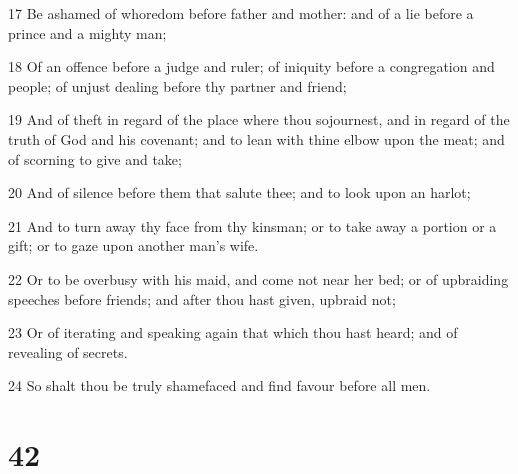 \par 17 Be ashamed of whoredom before father and mother: and of a lie before a prince and a mighty man;
\par 18 Of an offence before a judge and ruler; of iniquity before a congregation and people; of unjust dealing before thy partner and friend;
\par 19 And of theft in regard of the place where thou sojournest, and in regard of the truth of God and his covenant; and to lean with thine elbow upon the meat; and of scorning to give and take;
\par 20 And of silence before them that salute thee; and to look upon an harlot;
\par 21 And to turn away thy face from thy kinsman; or to take away a portion or a gift; or to gaze upon another man's wife.
\par 22 Or to be overbusy with his maid, and come not near her bed; or of upbraiding speeches before friends; and after thou hast given, upbraid not;
\par 23 Or of iterating and speaking again that which thou hast heard; and of revealing of secrets.
\par 24 So shalt thou be truly shamefaced and find favour before all men.

\chapter{42}

